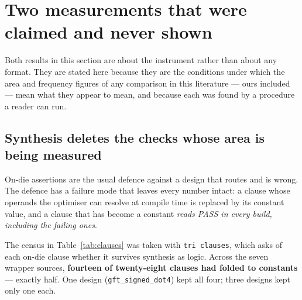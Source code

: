%

\section{Two measurements that were claimed and never shown}
\label{sec:themeasurements}

Both results in this section are about the instrument rather than about any
format. They are stated here because they are the conditions under which the
area and frequency figures of any comparison in this literature --- ours
included --- mean what they appear to mean, and because each was found by a
procedure a reader can run.

\subsection{Synthesis deletes the checks whose area is being measured}
\label{sec:folding}

On-die assertions are the usual defence against a design that routes and is
wrong. The defence has a failure mode that leaves every number intact: a clause
whose operands the optimiser can resolve at compile time is replaced by its
constant value, and a clause that has become a constant \emph{reads PASS in
every build, including the failing ones}.

The census in Table~\ref{tab:clauses} was taken with \texttt{tri clauses}, which
asks of each on-die clause whether it survives synthesis as logic. Across the
seven wrapper sources, \textbf{fourteen of twenty-eight clauses had folded to
constants} --- exactly half. One design (\texttt{gft\_signed\_dot4}) kept all
four; three designs kept only one each.

